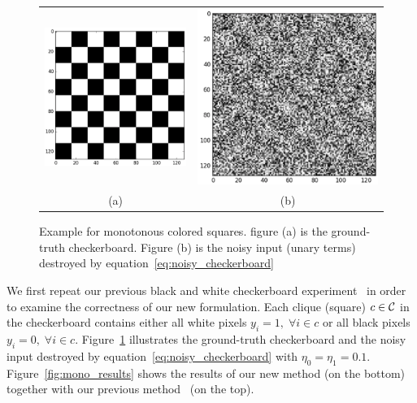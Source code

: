 \begin{figure}[hb]
  \centering
  \setlength{\tabcolsep}{2pt}
  \begin{tabular}{cc}
    \includegraphics[width=0.5\columnwidth]{Experiments/figures/mono_gt.png}&
                                                                            \includegraphics[width=0.5\columnwidth]{Experiments/figures/mono_noisy.png}\\
    {\small (a)} & {\small (b)} 
  \end{tabular}
  \caption{\label{fig:mono_checkerboard} Example for monotonous
    colored squares. figure (a) is the ground-truth checkerboard.
    Figure (b) is the noisy input (unary terms) destroyed by
    equation~\eqref{eq:noisy_checkerboard}}
\end{figure}

We first repeat our previous black and white checkerboard
experiment~\cite{Gould:ICML2011,gouldlearning} in order to
examine the correctness of our new formulation. Each clique
(square) $c\in {\mathcal{C}}$ in the checkerboard contains either all white
pixels $y_i=1 ,\;\forall i \in c$ or all black pixels $y_i=0
,\;\forall i \in c$. Figure~\ref{fig:mono_checkerboard}
illustrates the ground-truth checkerboard and the noisy input
destroyed by equation~\eqref{eq:noisy_checkerboard} with
$\eta_0=\eta_1=0.1$. Figure~\ref{fig:mono_results} shows the
results of our new method (on the bottom) together with our
previous method~\cite{gouldlearning} (on the top).

